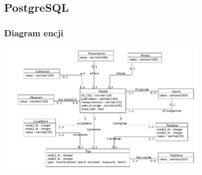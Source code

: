 \subsection{PostgreSQL}
\begin{frame}
 \frametitle{Diagram encji}
 \includegraphics[width=100mm]{./diagramy/diagram-encji-maly.pdf}
\end{frame}
